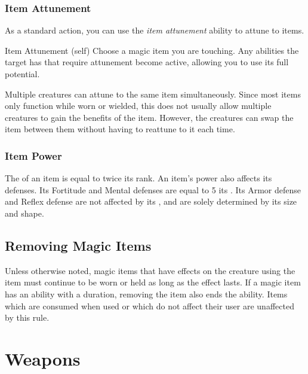         \subsubsection{Item Attunement}\label{Item Attunement}

            As a standard action, you can use the \textit{item attunement} ability to attune to items.

            \begin{attuneability}{Item Attunement}
                 (self)
                \rankline
                Choose a magic item you are touching.
                Any abilities the target has that require attunement become active, allowing you to use its full potential.
            \end{attuneability}

             Multiple creatures can attune to the same item simultaneously.
            Since most items only function while worn or wielded, this does not usually allow multiple creatures to gain the benefits of the item.
            However, the creatures can swap the item between them without having to reattune to it each time.

    \subsubsection{Item Power}\label{Item Power}
        The  of an item is equal to twice its rank.
        An item's power also affects its defenses.
        Its Fortitude and Mental defenses are equal to 5 \add its .
        Its Armor defense and Reflex defense are not affected by its , and are solely determined by its size and shape.

    \subsection{Removing Magic Items}
        Unless otherwise noted, magic items that have effects on the creature using the item must continue to be worn or held as long as the effect lasts.
        If a magic item has an ability with a duration, removing the item also ends the ability.
        Items which are consumed when used or which do not affect their user are unaffected by this rule.

\newpage
\section{Weapons}\label{Weapons}

